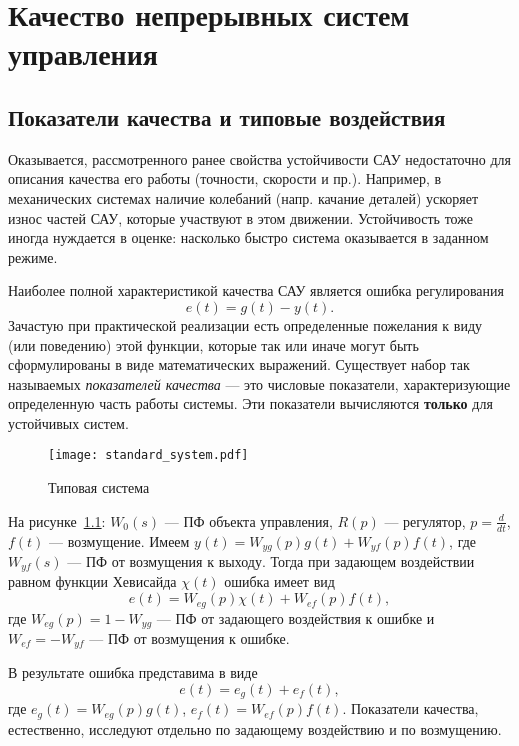 \documentclass[../../TAU.tex]{subfiles}
\begin{document}
\chapter{Качество непрерывных систем управления}

\section{Показатели качества и типовые воздействия}

    Оказывается, рассмотренного ранее свойства устойчивости САУ недостаточно для описания качества его работы (точности, скорости и пр.). Например, в механических системах наличие колебаний (напр. качание деталей) ускоряет износ частей САУ, которые участвуют в этом движении. Устойчивость тоже иногда нуждается в оценке: насколько быстро система оказывается в заданном режиме.

    Наиболее полной характеристикой качества САУ является ошибка регулирования
    $$
        e(t) = g(t) - y(t).
    $$
    Зачастую при практической реализации есть определенные пожелания к виду (или поведению) этой функции, которые так или иначе могут быть сформулированы в виде математических выражений. Существует набор так называемых {\it показателей качества} --- это числовые показатели, характеризующие определенную часть работы системы. Эти показатели вычисляются {\bf только} для  устойчивых систем.

    \begin{figure}[h]
        \centering
        \texttt{[image: standard\_system.pdf]}
        \centering
        \caption{Типовая система}
        \label{FIG1}
    \end{figure}

    На рисунке~\ref{FIG1}: $W_0(s)$ --- ПФ объекта управления, $R(p)$ --- регулятор, $p=\frac{d}{dt}$, $f(t)$  --- возмущение.
    Имеем $y(t) = W_{yg}(p)g(t) + W_{yf}(p)f(t)$, где $W_{yf}(s)$ --- ПФ от возмущения к выходу. Тогда при задающем воздействии равном функции Хевисайда $\chi(t)$ ошибка имеет вид
    $$
    e(t) = W_{eg}(p) \chi(t) + W_{ef}(p) f(t),
    $$
    где $W_{eg}(p) = 1-W_{yg}$ --- ПФ от задающего воздействия к ошибке и $W_{ef} = - W_{yf}$ --- ПФ от возмущения к ошибке.

    В результате ошибка представима в виде
    $$
        e(t) = e_g(t) + e_f(t),
    $$
    где $e_g(t) = W_{eg}(p) g(t)$, $e_f(t) = W_{ef}(p) f(t)$. Показатели качества, естественно, исследуют отдельно по задающему воздействию и по возмущению.
\end{document}
